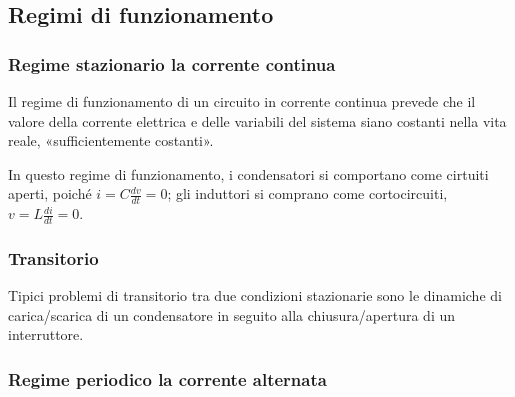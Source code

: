 \documentclass[letterpaper,10pt,italian]{jupyterBook}
\begin{document}
\subsection{Regimi di funzionamento}
\label{\detokenize{ch/electromagnetism/circuits-electric:regimi-di-funzionamento}}\label{\detokenize{ch/electromagnetism/circuits-electric:physics-hs-electromagnetism-circuits-electric-regimes}}

\subsubsection{Regime stazionario \sphinxhyphen{} la corrente continua}
\label{\detokenize{ch/electromagnetism/circuits-electric:regime-stazionario-la-corrente-continua}}\label{\detokenize{ch/electromagnetism/circuits-electric:physics-hs-electromagnetism-circuits-electric-regimes-dc}}
\sphinxAtStartPar
Il regime di funzionamento di un circuito in corrente continua prevede che il valore della corrente elettrica e delle variabili del sistema siano costanti \sphinxhyphen{} nella vita reale, «sufficientemente costanti».

\sphinxAtStartPar
In questo regime di funzionamento, i condensatori si comportano come cirtuiti aperti, poiché \(i = C \frac{dv}{dt} = 0\); gli induttori si comprano come cortocircuiti, \(v = L \frac{d i}{d t} = 0\).


\subsubsection{Transitorio}
\label{\detokenize{ch/electromagnetism/circuits-electric:transitorio}}\label{\detokenize{ch/electromagnetism/circuits-electric:physics-hs-electromagnetism-circuits-electric-regimes-dt}}
\sphinxAtStartPar
Tipici problemi di transitorio tra due condizioni stazionarie sono le dinamiche di carica/scarica di un condensatore in seguito alla chiusura/apertura di un interruttore.

\sphinxAtStartPar
{} 


\subsubsection{Regime periodico \sphinxhyphen{} la corrente alternata}
\label{\detokenize{ch/electromagnetism/circuits-electric:regime-periodico-la-corrente-alternata}}\label{\detokenize{ch/electromagnetism/circuits-electric:physics-hs-electromagnetism-circuits-electric-regimes-ac}}
\end{document}
